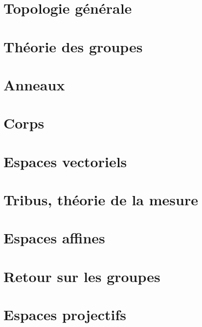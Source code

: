 \chapter{Topologie générale}



\chapter{Théorie des groupes}



\chapter{Anneaux}


\chapter{Corps}






\chapter{Espaces vectoriels}








%
\chapter{Tribus, théorie de la mesure}





\chapter{Espaces affines}


\chapter{Retour sur les groupes}




\chapter{Espaces projectifs}


